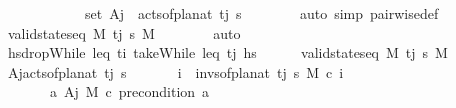 \begin{isabellebody}
\ \ \ \ \ \ \ \ \ \ \ \ {\isacartoucheopen}set\ A\isactrlsub j\ {\isacharequal}{\kern0pt}\ acts{\isacharunderscore}{\kern0pt}of{\isacharunderscore}{\kern0pt}plan{\isacharunderscore}{\kern0pt}at\ t\isactrlsub j\ {\isasympi}s{\isacartoucheclose}\isanewline
\ \ \ \ \ \ \isamarkupfalse%
\ {\isacharparenleft}{\kern0pt}auto\ simp{\isacharcolon}{\kern0pt}\ pairwise{\isacharunderscore}{\kern0pt}def{\isacharparenright}{\kern0pt}\isanewline
\ \ \ \ \isamarkupfalse%
\ \isamarkupfalse%
\ {\isachardoublequoteopen}valid{\isacharunderscore}{\kern0pt}state{\isacharunderscore}{\kern0pt}seq\ M\ {\isacharbrackleft}{\kern0pt}t\isactrlsub j{\isacharbrackright}{\kern0pt}\ {\isasympi}s\ M{\isacharprime}{\kern0pt}{\isachardoublequoteclose}\isanewline
\ \ \ \ \ \ \isamarkupfalse%
\ auto\isanewline
\ \ \isamarkupfalse%
\isanewline
\ \ \ \ \isamarkupfalse%
\ {\isacharquery}{\kern0pt}hs{\isacharprime}{\kern0pt}{\isacharequal}{\kern0pt}{\isachardoublequoteopen}dropWhile\ {\isacharparenleft}{\kern0pt}leq\ t\isactrlsub i{\isacharparenright}{\kern0pt}\ {\isacharparenleft}{\kern0pt}takeWhile\ {\isacharparenleft}{\kern0pt}leq\ t\isactrlsub j{\isacharparenright}{\kern0pt}\ hs{\isacharparenright}{\kern0pt}{\isachardoublequoteclose}\isanewline
\ \ \ \ \isamarkupfalse%
\ {\isachardoublequoteopen}valid{\isacharunderscore}{\kern0pt}state{\isacharunderscore}{\kern0pt}seq\ M\ {\isacharbrackleft}{\kern0pt}t\isactrlsub j{\isacharbrackright}{\kern0pt}\ {\isasympi}s\ M{\isacharprime}{\kern0pt}{\isachardoublequoteclose}\isanewline
\ \ \ \ \isamarkupfalse%
\ {\isacharquery}{\kern0pt}A\isactrlsub j{\isacharequal}{\kern0pt}{\isachardoublequoteopen}acts{\isacharunderscore}{\kern0pt}of{\isacharunderscore}{\kern0pt}plan{\isacharunderscore}{\kern0pt}at\ t\isactrlsub j\ {\isasympi}s{\isachardoublequoteclose}\isanewline
\ \ \ \ \isamarkupfalse%
\ {}{\isacharcolon}{\kern0pt}\ {\isachardoublequoteopen}{\isasymforall}i\ {\isasymin}\ invs{\isacharunderscore}{\kern0pt}of{\isacharunderscore}{\kern0pt}plan{\isacharunderscore}{\kern0pt}at\ t\isactrlsub j\ {\isasympi}s{\isachardot}{\kern0pt}\ M\ \isactrlsup c{\isasymTTurnstile}\isactrlsub {\isacharequal}{\kern0pt}\ i{\isachardoublequoteclose}\isanewline
\ \ \ \ \ \ {}{\isacharcolon}{\kern0pt}\ {\isachardoublequoteopen}{\isasymforall}a{\isasymin}\ {\isacharquery}{\kern0pt}A\isactrlsub j{\isachardot}{\kern0pt}\ M\ \isactrlsup c{\isasymTTurnstile}\isactrlsub {\isacharequal}{\kern0pt}\ precondition\ a{\isachardoublequoteclose}\ \isanewline

\end{isabellebody}
